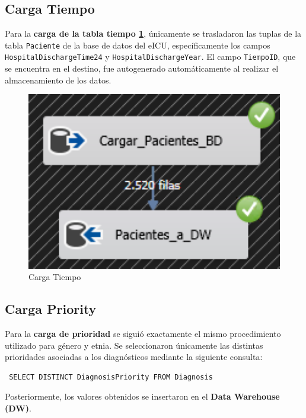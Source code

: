\documentclass[12pt, a4paper, twoside]{article}
\begin{document}
	
	\subsection{Carga Tiempo}
	
	Para la \textbf{carga de la tabla tiempo \ref{fig:18}}, únicamente se trasladaron las tuplas de la tabla \texttt{Paciente} de la base de datos del eICU, específicamente los campos \texttt{HospitalDischargeTime24} y \texttt{HospitalDischargeYear}. El campo \texttt{TiempoID}, que se encuentra en el destino, fue autogenerado automáticamente al realizar el almacenamiento de los datos.
	
	\begin{figure}[h!]
		\centering
		\includegraphics[width=1\textwidth]{image/109_carga_tiempo.png}
		\caption{Carga Tiempo}
		\label{fig:18}
	\end{figure}
	
	\subsection{Carga Priority}
	
	Para la \textbf{carga de prioridad} se siguió exactamente el mismo procedimiento utilizado para género y etnia. Se seleccionaron únicamente las distintas prioridades asociadas a los diagnósticos mediante la siguiente consulta:
	
	\begin{verbatim} SELECT DISTINCT DiagnosisPriority FROM Diagnosis \end{verbatim}
	
	Posteriormente, los valores obtenidos se insertaron en el \textbf{Data Warehouse (DW)}.
	
\end{document}
